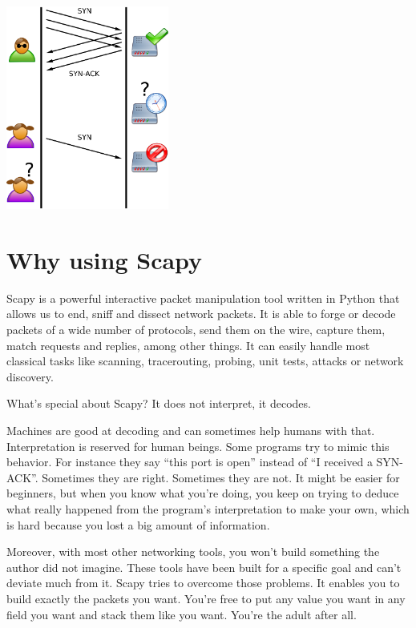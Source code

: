 \documentclass[11pt]{article}
\begin{document}
\begin{center}
\vfill
\includegraphics[width=0.4\textwidth]{tcp-synflood.png}\\[1cm]
\end{center}

\clearpage

\section{Why using Scapy}\index{}
Scapy is a powerful interactive packet manipulation tool written in Python that allows us to end, sniff and dissect network packets. It is able to forge or decode packets of a wide number of protocols, send them on the wire, capture them, match requests and replies, among other things. It can easily handle most classical tasks like scanning, tracerouting, probing, unit tests, attacks or network discovery.\vspace{5mm}

What's special about Scapy? It does not interpret, it decodes.\vspace{5mm}

Machines are good at decoding and can sometimes help humans with that. Interpretation is reserved for human beings. Some programs try to mimic this behavior. For instance they say “this port is open” instead of “I received a SYN-ACK”. Sometimes they are right. Sometimes they are not. It might be easier for beginners, but when you know what you’re doing, you keep on trying to deduce what really happened from the program’s interpretation to make your own, which is hard because you lost a big amount of information.\vspace{5mm}

Moreover, with most other networking tools, you won’t build something the author did not imagine. These tools have been built for a specific goal and can’t deviate much from it. Scapy tries to overcome those problems. It enables you to build exactly the packets you want. You’re free to put any value you want in any field you want and stack them like you want. You’re the adult after all.\vspace{5mm}
\end{document}
